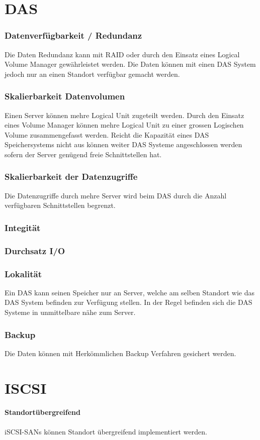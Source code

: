 
\section{DAS}
\subsubsection{Datenverfügbarkeit / Redundanz}
Die Daten Redundanz kann mit RAID oder durch den Einsatz eines Logical Volume Manager gewährleistet werden. Die Daten können mit einen DAS System jedoch nur an einen Standort verfügbar gemacht werden.

\subsubsection{Skalierbarkeit Datenvolumen}
Einen Server können mehre Logical Unit zugeteilt werden. Durch den Einsatz eines Volume Manager können mehre Logical Unit zu einer grossen Logischen Volume zusammengefasst werden. 
Reicht die Kapazität eines DAS Speichersystems nicht aus können weiter DAS Systeme angeschlossen werden sofern der Server genügend freie Schnittstellen hat.

\subsubsection{Skalierbarkeit der Datenzugriffe}
Die Datenzugriffe durch mehre Server wird beim DAS durch die Anzahl verfügbaren Schnittstellen begrenzt.
\subsubsection{Integität}
\subsubsection{Durchsatz I/O}

\subsubsection{Lokalität}
Ein DAS kann seinen Speicher nur an Server, welche am selben Standort wie das DAS System befinden zur Verfügung stellen. In der Regel befinden sich die DAS Systeme in unmittelbare nähe zum Server.

\subsubsection{Backup}
Die Daten können mit Herkömmlichen Backup Verfahren gesichert werden.

\section{ISCSI}
\paragraph*{Standortübergreifend}
iSCSI-SANs können Standort übergreifend implementiert werden.
